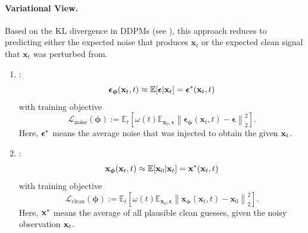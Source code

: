 \paragraph{Variational View.} Based on the KL divergence in DDPMs (see ), this approach reduces to predicting either the expected noise that produces $\mathbf{x}_t$ or the expected clean signal that $\mathbf{x}_t$ was perturbed from.
\begin{enumerate}
    \item {} \citep{ho2020denoising}:
    \begin{equation}\label{eq:noise-def}
        \bm{\epsilon}_{\bm{\phi}}(\mathbf{x}_t,t) \approx \mathbb{E}[\bm{\epsilon}|\mathbf{x}_t]=\bm{\epsilon}^*({\mathbf{x}}_t, t)
    \end{equation}
    with training objective
    \[
        \mathcal{L}_{\text{noise}}(\bm{\phi}) := \mathbb{E}_t \left[\omega(t) \mathbb{E}_{\mathbf{x}_0, \bm{\epsilon}} \left\| \bm{\epsilon}_{\bm{\phi}}(\mathbf{x}_t,t) - \bm{\epsilon} \right\|_2^2 \right].
    \]
    Here, ${\bm{\epsilon}}^*$ means the average noise that was injected to obtain the given ${\mathbf{x}}_t$.

    \item {} \citep{kingma2021variational,karras2022elucidating,song2023consistency}:
    \begin{equation}\label{eq:clean-def}
        \mathbf{x}_{\bm{\phi}}(\mathbf{x}_t,t) \approx \mathbb{E}[\mathbf{x}_0|\mathbf{x}_t]={\mathbf{x}}^*({\mathbf{x}}_t, t)
    \end{equation}
    with training objective
    \[
        \mathcal{L}_{\text{clean}}(\bm{\phi}) := \mathbb{E}_t \left[\omega(t) \mathbb{E}_{\mathbf{x}_0, \bm{\epsilon}} \left\| \mathbf{x}_{\bm{\phi}}(\mathbf{x}_t,t) - \mathbf{x}_0 \right\|_2^2 \right].
    \]
    Here, ${\mathbf{x}}^*$ means the average of all plausible clean guesses, given the noisy observation ${\mathbf{x}}_t$.
\end{enumerate}

